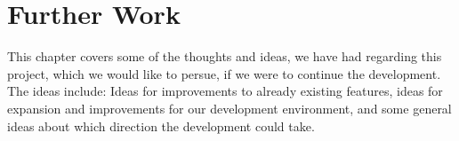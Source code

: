 
\chapter{Further Work}
\label{cha:future_work}

This chapter covers some of the thoughts and ideas, we have had regarding this project, which we would like to persue, if we were to continue the development. The ideas include: Ideas for improvements to already existing features, ideas for expansion and improvements for our development environment, and some general ideas about which direction the development could take. 















